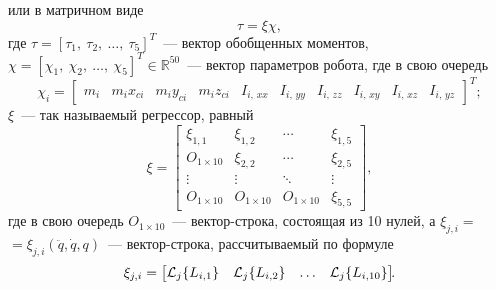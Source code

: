 или в матричном виде
\begin{equation}\label{eq_dynamic_in_linear}
    \tau = \xi \chi,
\end{equation}
где $\tau = [\tau_1, \: \tau_2, \: \ldots, \: \tau_5]^T$~--- вектор обобщенных моментов,\\ $\chi=[\chi_1, \: \chi_2, \: \ldots, \: \chi_5]^T \in \mathbb R^{50}$~--- вектор параметров робота, где в свою очередь
\begin{equation}
    \chi_i =
    \begin{bmatrix}
        m_i & m_i x_{ci} & m_i y_{ci} & m_i z_{ci} & I_{i,\,xx} & I_{i,\,yy} & I_{i,\,zz} & I_{i,\,xy} & I_{i,\,xz} & I_{i,\,yz}
    \end{bmatrix}^T\!\!\!\!;
\end{equation}
$\xi$~--- так называемый регрессор, равный
\begin{equation}
    \xi =
    \begin{bmatrix}
        \xi_{1,1} & \xi_{1,2} & \cdots & \xi_{1,5} \\
        O_{1 \times 10} & \xi_{2,2} & \cdots & \xi_{2,5} \\
        \vdots & \vdots & \ddots & \vdots \\
        O_{1 \times 10} & O_{1 \times 10} & O_{1 \times 10} & \xi_{5,5}
    \end{bmatrix}\!\!,
\end{equation}
где в свою очередь $O_{1 \times 10}$~--- вектор-строка, состоящая из 10 нулей, а $\xi_{j,i} =$\linebreak $= \xi_{j,i}(\ddot{q}, \dot{q}, q)$~--- вектор-строка, рассчитываемый по формуле
\begin{equation}
    \xi_{j,i} =
    \begin{bmatrix}
        \mathcal{L}_j \{L_{i,1}\} & \mathcal{L}_j \{L_{i,2}\} & \ldots & \mathcal{L}_j \{L_{i,10}\}
    \end{bmatrix}\!\!\ldotp
\end{equation}

